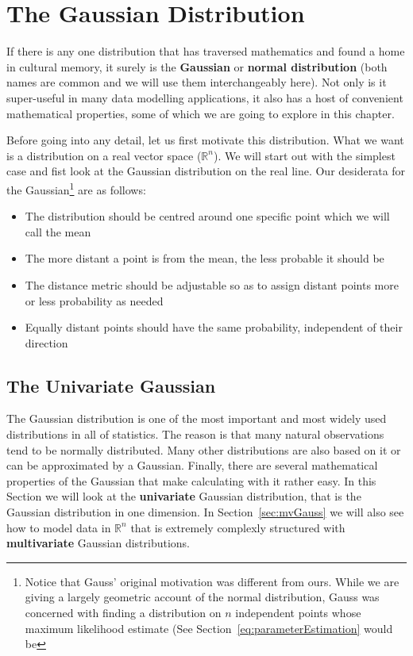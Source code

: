\chapter{The Gaussian Distribution}

If there is any one distribution that has traversed mathematics and found a home in cultural memory, it surely is the \textbf{Gaussian} or \textbf{normal distribution}
(both names are common and we will use them interchangeably here). 
Not only is it super-useful in many data modelling applications, it also has a host of convenient mathematical properties, some of which we are going
to explore in this chapter. 

Before going into any detail, let us first motivate this distribution. What we want is a distribution on a real vector space ($ \mathbb{R}^{n} $). We will
start out with the simplest case and fist look at the Gaussian distribution on the real line. Our desiderata for the Gaussian\footnote{Notice that Gauss' original
motivation was different from ours. While we are giving a largely geometric account of the normal distribution, Gauss was concerned with finding a distribution
on $ n $ independent points whose maximum likelihood estimate (See Section~\ref{eq:parameterEstimation} would be } are as follows:
\begin{itemize}
\item The distribution should be centred around one specific point which we will call the mean
\item The more distant a point is from the mean, the less probable it should be
\item The distance metric should be adjustable so as to assign distant points more or less probability as needed
\item Equally distant points should have the same probability, independent of their direction
\end{itemize}

\section{The Univariate Gaussian}

The Gaussian distribution is one of the most important and most widely used distributions in all of statistics. The reason is that many natural observations
tend to be normally distributed. Many other distributions are also based on it or can be approximated by a Gaussian. Finally, there are several mathematical
properties of the Gaussian that make calculating with it rather easy. In this Section we will look at the \textbf{univariate} Gaussian distribution, that is
the Gaussian distribution in one dimension. In Section~\ref{sec:mvGauss} we will also see how to model data in $ \mathbb{R}^{n} $ that is extremely complexly 
structured with \textbf{multivariate} Gaussian distributions.

